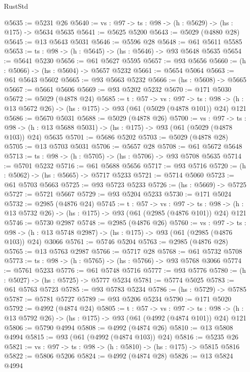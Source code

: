 \begin{lexlean}{RustStd}
\begin{coremodule}
@5635 := @5231 @26
@5640 := {vs : @97} -> {ts : @98} -> (h : @5629) -> (hs : @175) -> @5634 @5635
@5641 := @5625 @5200
@5643 := @5029 (@4880 @28)
@5645 := @13 @5643 @5031
@5646 := @5596 @28
@5648 := @61 @5611 @5585
@5653 := {ts : @98} -> (h : @5645) -> (hs : @5646) -> @93 @5648 @5635
@5654 := @5641 @5230
@5656 := @61 @5627 @5595
@5657 := @93 @5656
@5660 := (h : @5066) -> (hs : @5604) -> @5657 @5232
@5661 := @5654 @5064
@5663 := @61 @5643 @5602
@5665 := @93 @5663 @5232
@5666 := (hs : @5608) -> @5665
@5667 := @5661 @5606
@5669 := @93 @5202 @5232
@5670 := @171 @5030
@5672 := @5029 (@4878 @24)
@5685 := {t : @57} ->
  {vs : @97} ->
  {ts : @98} -> (h : @13 @5672 @26) -> (hs : @175) -> @93 (@61 (@5029 (@4878 @101)) @24) @121
@5686 := @5670 @5031
@5688 := @5029 (@4878 @26)
@5700 := {vs : @97} ->
  {ts : @98} -> (h : @13 @5688 @5031) -> (hs : @175) -> @93 (@61 (@5029 (@4878 @103)) @24) @5635
@5701 := @5686 @5202
@5703 := @5029 (@4878 @28)
@5705 := @13 @5703 @5031
@5706 := @5657 @28
@5708 := @61 @5672 @5648
@5713 := {ts : @98} -> (h : @5705) -> (hs : @5706) -> @93 @5708 @5635
@5714 := @5701 @5232
@5716 := @61 @5688 @5656
@5717 := @93 @5716
@5720 := (h : @5062) -> (hs : @5665) -> @5717 @5233
@5721 := @5714 @5060
@5723 := @61 @5703 @5663
@5725 := @93 @5723 @5233
@5726 := (hs : @5669) -> @5725
@5727 := @5721 @5667
@5729 := @93 @5204 @5233
@5730 := @171 @5024
@5732 := @2985 (@4876 @24)
@5745 := {t : @57} ->
  {vs : @97} ->
  {ts : @98} -> (h : @13 @5732 @26) -> (hs : @175) -> @93 (@61 (@2985 (@4876 @101)) @24) @121
@5746 := @5730 @2987
@5748 := @2985 (@4876 @26)
@5760 := {vs : @97} ->
  {ts : @98} -> (h : @13 @5748 @2987) -> (hs : @175) -> @93 (@61 (@2985 (@4876 @103)) @24) @3066
@5761 := @5746 @5204
@5763 := @2985 (@4876 @28)
@5765 := @13 @5763 @2987
@5766 := @5717 @28
@5768 := @61 @5732 @5708
@5773 := {ts : @98} -> (h : @5765) -> (hs : @5766) -> @93 @5768 @3066
@5774 := @5761 @5233
@5776 := @61 @5748 @5716
@5777 := @93 @5776
@5780 := (h : @5027) -> (hs : @5725) -> @5777 @5234
@5781 := @5774 @5025
@5783 := @61 @5763 @5723
@5785 := @93 @5783 @5234
@5786 := (hs : @5729) -> @5785
@5787 := @5781 @5727
@5789 := @93 @5206 @5234
@5790 := @171 @5020
@5792 := @4992 (@4874 @24)
@5805 := {t : @57} ->
  {vs : @97} ->
  {ts : @98} -> (h : @13 @5792 @26) -> (hs : @175) -> @93 (@61 (@4992 (@4874 @101)) @24) @121
@5806 := @5790 @4994
@5808 := @4992 (@4874 @26)
@5810 := @13 @5808 @4994
@5815 := @93 (@61 (@4992 (@4874 @103)) @24)
@5816 := @5235 @26
@5821 := {vs : @97} -> {ts : @98} -> (h : @5810) -> (hs : @175) -> @5815 @5816
@5822 := @5806 @5206
@5824 := @4992 (@4874 @28)
@5826 := @13 @5824 @4994

\end{coremodule}
\end{lexlean}
